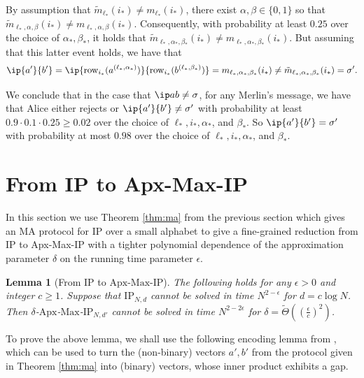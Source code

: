 \documentclass[11pt]{article}
\theoremstyle{plain}
\newtheorem{lem}[thm]{Lemma}
\theoremstyle{remark}
\newcommand{\IP}{\mathrm{IP}}
\newcommand{\Max}{\mathrm{Max}}
\newcommand{\Apx}{\mathrm{Apx}}
\newcommand{\row}{\mathrm{row}}
\begin{document}
 By assumption that $\tilde m_{\ell_*} (i_*) \neq m_{\ell_*} (i_*)$, there exist $\alpha, \beta \in \{0,1\}$ so that $\tilde m_{\ell_*,\alpha,\beta}(i_*) \neq  m_{\ell_*,\alpha,\beta}(i_*)$. Consequently, with probability at least $0.25$ over the choice of $\alpha_*, \beta_*$, it holds that 
$\tilde m_{\ell_*,\alpha_*,\beta_*}(i_*) \neq  m_{\ell_*,\alpha_*,\beta_*}(i_*)$. 
But assuming that this latter event holds, we have that 
$$ \ip {a'} {b'} = \ip {\row_{i_*} (a^{(\ell_*, \alpha_*)})} {\row_{i_*} (b^{(\ell_*,  \beta_*)})} = 
m_{\ell_*,\alpha_*,\beta_*}(i_*) \neq \tilde m_{\ell_*,\alpha_*,\beta_*}(i_*) = \sigma' .$$

We conclude that in the case that $\ip a b \neq \sigma$, for any Merlin's message, we have that Alice either rejects or $\ip {a'} {b'} \neq \sigma'$ with probability at least $0.9 \cdot 0.1 \cdot 0.25 \geq 0.02$ over the choice of $\ell_*, i_*, \alpha_*$, and  $\beta_*$. So $\ip {a'} {b'} = \sigma'$ with probability at most $0.98$ over the choice of $\ell_*, i_*, \alpha_*$, and  $\beta_*$. 



\section{From IP to Apx-Max-IP}\label{sec:ip_to_apx_max_ip}


In this section we use Theorem \ref{thm:ma} from the previous section which gives an MA protocol for IP over a small alphabet to give a fine-grained reduction from IP to Apx-Max-IP with a tighter polynomial dependence of the approximation parameter $\delta$ on the running time parameter $\epsilon$.

\begin{lem}[From $\IP$ to $\Apx$-$\Max$-$\IP$]\label{lem:ip_to_maxip}
The following holds for any $\epsilon >0$ and integer $c \geq 1$.
Suppose that $\IP_{N,d}$ cannot be solved in time $N^{2-\epsilon}$ for $d = c \log N$. Then $\delta$-$\Apx$-$\Max$-$\IP_{N,d'}$ cannot be solved in time $N^{2-2\epsilon}$ for $\delta = \tilde \Theta( ( \frac \epsilon c)^2 )$. 
\end{lem}

To prove the above lemma, we shall use the following encoding lemma from \cite{CW19}, which can be used to turn the (non-binary) vectors $a',b'$ from the protocol given in Theorem \ref{thm:ma} into (binary) vectors, whose inner product exhibits a gap.
\end{document}
